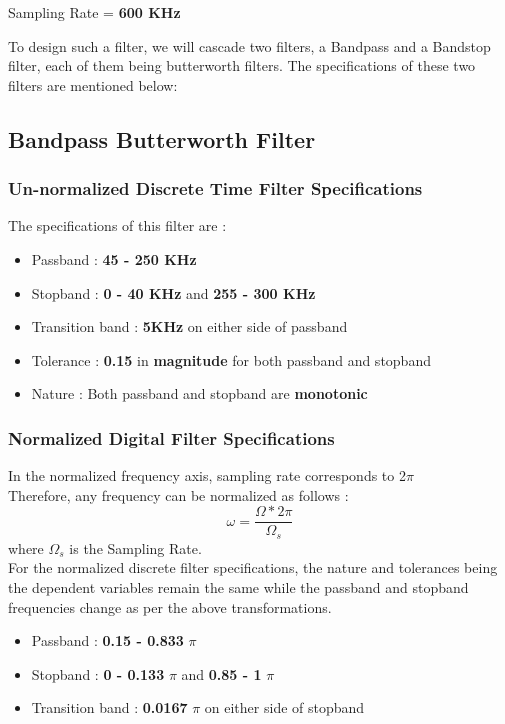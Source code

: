 \documentclass{article}
\begin{document}
Sampling Rate = \textbf{600 KHz}\\
\noindent

To design such a filter, we will cascade two filters, a Bandpass and a Bandstop filter, each of them being butterworth filters. The specifications of these two filters are mentioned below:

\subsection{\textbf{Bandpass Butterworth Filter}}
\subsubsection{\textbf{Un-normalized Discrete Time Filter Specifications}}

\noindent
The specifications of this filter are :
\begin{itemize}
    \item Passband : \textbf{45 - 250 KHz}
    \item Stopband : \textbf{0 - 40 KHz} and \textbf{255 - 300 KHz}
    \item  Transition band : \textbf{5KHz} on either side of passband
    \item  Tolerance : \textbf{0.15} in \textbf{magnitude} for both passband and stopband
    \item  Nature : Both passband and stopband are \textbf{monotonic}
\end{itemize}

\subsubsection{Normalized Digital Filter Specifications}

In the normalized frequency axis, sampling rate corresponds to 2$\pi$\\
Therefore, any frequency can be normalized as follows :
\begin{equation*}
    \omega = \frac{\Omega*2\pi}{\Omega_s}
\end{equation*}
where $\Omega_s$ is the Sampling Rate.\\

\vspace{1em}
\noindent
For the normalized discrete filter specifications, the nature and tolerances being the dependent variables remain the same while the passband and stopband frequencies change as per the above transformations. 
\begin{itemize}
    \item Passband : \textbf{0.15 - 0.833} {$\pi$}
    \item Stopband : \textbf{0 -  0.133} {$\pi$} and \textbf{0.85 - 1} {$\pi$}
    \item  Transition band : \textbf{0.0167} $\pi$ on either side of stopband
\end{itemize}
\end{document}
